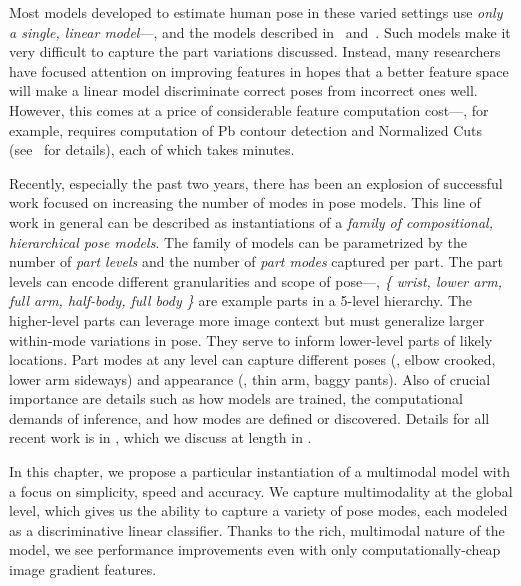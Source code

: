 Most models developed to estimate human pose in these varied settings use {\em 
only a single, linear model}---\eg, 
\citet{devacrf,eichner09,andriluka09,ddtran} and the models described
in~ and~.
Such models make it very difficult to capture the part variations discussed.  
Instead, many researchers have focused attention on improving features in hopes 
that a better feature space will make a linear model discriminate correct poses 
from incorrect ones well.  However, this comes at a price of considerable 
feature computation cost---\CPS, for example, requires computation of Pb 
contour detection and Normalized Cuts (see~ for details), each 
of which takes minutes.

Recently, especially the past two years, there has been an explosion of  
successful work focused on increasing the number of modes in pose models. This 
line of work in general can be described as instantiations of a {\em family of 
compositional, hierarchical pose models}.  The family of models can be 
parametrized by the number of {\em part levels } and the number of {\em part 
modes} captured per part.  The part levels can encode different granularities 
and scope of pose---\eg, {\em \{ wrist, lower arm, full arm, half-body, full 
body \}} are example parts in a 5-level hierarchy.  The higher-level parts can 
leverage more image context but must generalize larger within-mode variations 
in pose.  They serve to inform lower-level parts of likely locations.  Part 
modes at any level can capture different poses (\eg, elbow crooked, lower arm 
sideways) and appearance (\eg, thin arm, baggy pants).  Also of crucial 
importance are details such as how models are trained, the computational 
demands of inference, and how modes are defined or discovered.  Details for all 
recent work is in , which we discuss at length in 
.


 In this chapter, we propose a particular instantiation of 
a multimodal model with a focus on simplicity, speed and accuracy.  We capture 
multimodality at the global level, which gives us the ability to capture a 
variety of pose modes, each modeled as a discriminative linear classifier.  
Thanks to the rich, multimodal nature of the model, we see performance 
improvements even with only computationally-cheap image gradient features.  

